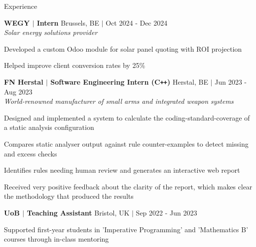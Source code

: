 \documentclass{resume} %
\let\olditemize\itemize
\let\endolditemize\enditemize
\renewenvironment{itemize}{
  \vspace*{-6pt} %
  \olditemize
  \setlength{\itemsep}{0pt}
  \setlength{\topsep}{0pt}         %
  \setlength{\partopsep}{0pt}      %
  \setlength{\parsep}{0pt}         %
  \setlength{\parskip}{0pt}        %
  \setlength{\leftmargin}{1em}
}{
  \endolditemize
  \vspace*{-6pt} %
}
\begin{document}
\begin{rSection}{Experience}

\textbf{WEGY $\boldsymbol{\vert}$ Intern} \hfill Brussels, BE $\boldsymbol{\vert}$ Oct 2024 - Dec 2024\\
\textit{Solar energy solutions provider}
\begin{itemize}
    \item Developed a custom Odoo module for solar panel quoting with ROI projection
    \item Helped improve client conversion rates by 25\%
\end{itemize}

\textbf{FN Herstal $\boldsymbol{\vert}$ Software Engineering Intern (C\texttt{++})} \hfill Herstal, BE $\boldsymbol{\vert}$ Jun 2023 - Aug 2023\\
\textit{World-renowned manufacturer of small arms and integrated weapon systems}
\begin{itemize}
    \item Designed and implemented a system to calculate the coding-standard-coverage of a static analysis configuration
    \item Compares static analyser output against rule counter-examples to detect missing and excess checks
    \item Identifies rules needing human review and generates an interactive web report
    \item Received very positive feedback about the clarity of the report, which makes clear the methodology that produced the results
\end{itemize}

\textbf{UoB $\boldsymbol{\vert}$ Teaching Assistant} \hfill Bristol, UK $\boldsymbol{\vert}$ Sep 2022 - Jun 2023
\begin{itemize}
    \item Supported first-year students in 'Imperative Programming' and 'Mathematics B' courses through in-class mentoring
\end{itemize}

\end{rSection}

\end{document}
